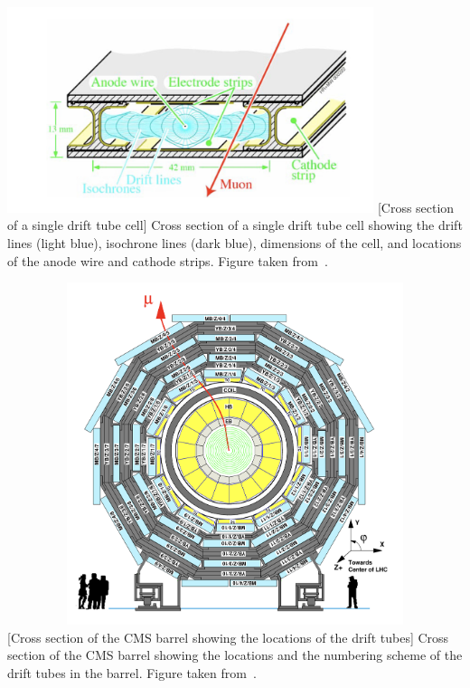 \begin{multiFigure}
    \centering
    \includegraphics[height=6cm,keepaspectratio]{figures/cms/muonsys/drifttube_xs.jpeg}
        [Cross section of a single drift tube cell]
        {Cross section of a single drift tube cell showing the drift lines (light blue), isochrone lines (dark blue), dimensions of the cell, and locations of the anode wire and cathode strips.
        Figure taken from~\cite{PhysRevLett.114.191803}. %
        }
    \label{fig:dt_cell}
\end{multiFigure}
\begin{multiFigure}
    \centering
    \includegraphics[width=15cm,height=10cm,keepaspectratio]{figures/cms/muonsys/drifttube_locations.jpeg}
        [Cross section of the CMS barrel showing the locations of the drift tubes]
        {Cross section of the CMS barrel showing the locations and the numbering scheme of the drift tubes in the barrel.
        Figure taken from~\cite{PhysRevLett.114.191803}. %
        }
        \label{fig:dt_locations}
\end{multiFigure}

